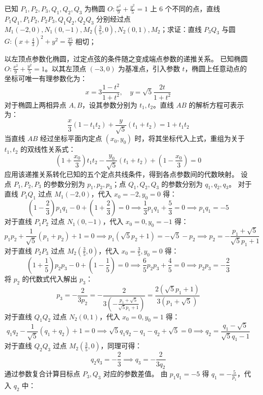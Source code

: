 \begin{example}
已知 \(P_1,P_2,P_3,Q_1,Q_2,Q_3\) 为椭圆 \(O: \frac{x^2}{9} + \frac{y^2}{5} = 1\) 上 6 个不同的点，直线 \(P_1Q_1,P_1P_2,P_2P_3,Q_1Q_2,Q_2Q_3\) 分别经过点 \(M_1(-2,0),N_1(0,-1),M_2\left(\frac{3}{5},0\right),N_2(0,1),M_2\)；求证：直线 \(P_3Q_3\) 与圆 \(G: \left(x + \frac{4}{3}\right)^2 + y^2 = \frac{25}{9}\) 相切；
\end{example}
\begin{solution}
以左顶点参数化椭圆，过定点弦的条件随之变成端点参数的递推关系。
已知椭圆 $O: \frac{x^2}{9} + \frac{y^2}{5} = 1$。以其左顶点 $(-3, 0)$ 为基准点，引入参数 $t$，椭圆上任意动点的坐标可唯一有理参数化为：
\[ x = 3 \frac{1-t^2}{1+t^2}, \quad y = \sqrt{5} \frac{2t}{1+t^2} \]
对于椭圆上两相异点 $A, B$，设其参数分别为 $t_1, t_2$。直线 $AB$ 的解析方程可表示为：
\[ \frac{x}{3}(1 - t_1 t_2) + \frac{y}{\sqrt{5}}(t_1 + t_2) = 1 + t_1 t_2 \]
当直线 $AB$ 经过坐标平面内定点 $(x_0, y_0)$ 时，将其坐标代入上式，重组为关于 $t_1, t_2$ 的双线性关系式：
\[ \left(1 + \frac{x_0}{3}\right) t_1 t_2 - \frac{y_0}{\sqrt{5}}(t_1 + t_2) + \left(1 - \frac{x_0}{3}\right) = 0 \]
应用该递推关系转化已知的五个定点共线条件，得到各点参数间的代数映射。
设点 $P_1, P_2, P_3$ 的参数分别为 $p_1, p_2, p_3$；点 $Q_1, Q_2, Q_3$ 的参数分别为 $q_1, q_2, q_3$。
对于直线 $P_1Q_1$ 过点 $M_1(-2, 0)$，代入 $x_0 = -2, y_0 = 0$ 得：
\[ \left(1 - \frac{2}{3}\right) p_1 q_1 - 0 + \left(1 + \frac{2}{3}\right) = 0 \implies \frac{1}{3} p_1 q_1 + \frac{5}{3} = 0 \implies p_1 q_1 = -5 \]
对于直线 $P_1P_2$ 过点 $N_1(0, -1)$，代入 $x_0 = 0, y_0 = -1$ 得：
\[ p_1 p_2 + \frac{1}{\sqrt{5}}(p_1 + p_2) + 1 = 0 \implies p_1(\sqrt{5}p_2 + 1) = -\sqrt{5} - p_2 \implies p_2 = -\frac{p_1 + \sqrt{5}}{\sqrt{5}p_1 + 1} \]
对于直线 $P_2P_3$ 过点 $M_2\left(\frac{3}{5}, 0\right)$，代入 $x_0 = \frac{3}{5}, y_0 = 0$ 得：
\[ \left(1 + \frac{1}{5}\right) p_2 p_3 - 0 + \left(1 - \frac{1}{5}\right) = 0 \implies \frac{6}{5} p_2 p_3 + \frac{4}{5} = 0 \implies p_2 p_3 = -\frac{2}{3} \]
将 $p_2$ 的代数式代入解出 $p_3$：
\[ p_3 = -\frac{2}{3p_2} = -\frac{2}{3 \left( -\frac{p_1 + \sqrt{5}}{\sqrt{5}p_1 + 1} \right)} = \frac{2(\sqrt{5}p_1 + 1)}{3(p_1 + \sqrt{5})} \]
对于直线 $Q_1Q_2$ 过点 $N_2(0, 1)$，代入 $x_0 = 0, y_0 = 1$ 得：
\[ q_1 q_2 - \frac{1}{\sqrt{5}}(q_1 + q_2) + 1 = 0 \implies \sqrt{5}q_1 q_2 - q_1 - q_2 + \sqrt{5} = 0 \implies q_2 = \frac{q_1 - \sqrt{5}}{\sqrt{5}q_1 - 1} \]
对于直线 $Q_2Q_3$ 过点 $M_2\left(\frac{3}{5}, 0\right)$，同理可得：
\[ q_2 q_3 = -\frac{2}{3} \implies q_3 = -\frac{2}{3q_2} \]
通过参数复合计算目标点 $P_3, Q_3$ 对应的参数差值。
由 $p_1 q_1 = -5$ 得 $q_1 = -\frac{5}{p_1}$，代入 $q_2$ 中：

\end{solution}
